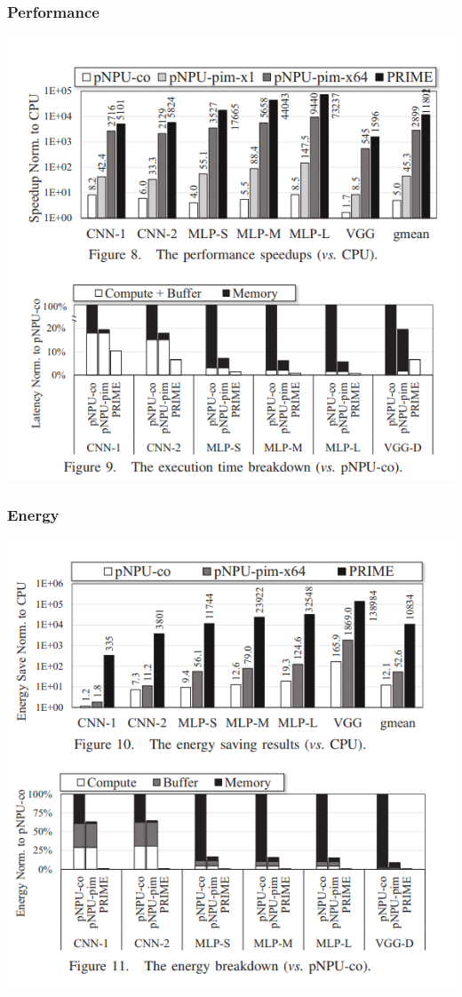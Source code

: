 \documentclass[hyperref={colorlinks}]{beamer}
\begin{document}
\begin{frame}
	\frametitle{Performance}
	\includegraphics[scale=0.4, center]{performance.png}	
\end{frame}

\begin{frame}
	\frametitle{Energy}
	\includegraphics[scale=0.4, center]{energy.png}	
\end{frame}
\end{document}
